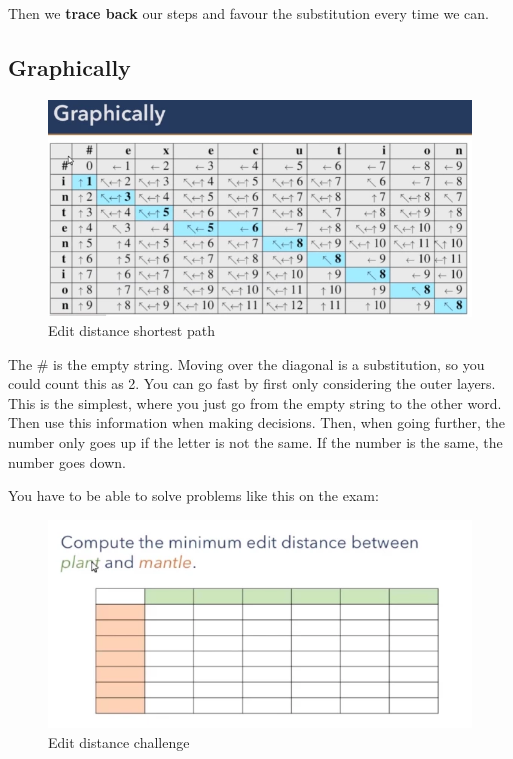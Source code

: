 \documentclass[
  11pt,
  british,
]{article}
\begin{document}
Then we \textbf{trace back} our steps and favour the substitution every
time we can.

\hypertarget{graphically}{%
\subsection{Graphically}\label{graphically}}

\begin{figure}
\centering
\includegraphics{Pasted_image_20220217170600.png}
\caption{Edit distance shortest path}
\end{figure}

The \# is the empty string. Moving over the diagonal is a substitution,
so you could count this as 2. You can go fast by first only considering
the outer layers. This is the simplest, where you just go from the empty
string to the other word. Then use this information when making
decisions. Then, when going further, the number only goes up if the
letter is not the same. If the number is the same, the number goes down.

You have to be able to solve problems like this on the exam:

\begin{figure}
\centering
\includegraphics{Pasted_image_20220217171236.png}
\caption{Edit distance challenge}
\end{figure}
\end{document}
